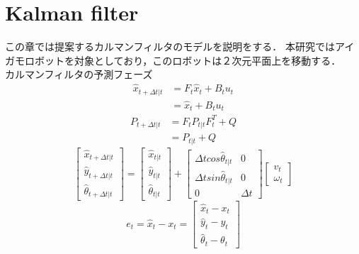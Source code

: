 \documentclass[a4paper]{article}
\begin{document}
\section{Kalman filter}
この章では提案するカルマンフィルタのモデルを説明をする．
本研究ではアイガモロボットを対象としており，このロボットは２次元平面上を移動する． \\
カルマンフィルタの予測フェーズ
\begin{align}
    \hat{x}_{t+ \Delta t|t} &= F_{t} \hat{x}_{t} + B_{t} u_{t} \nonumber \\
                            &= \hat{x}_{t} + B_{t} u_{t}
    \label{eq:1}
\end{align}
%
%
\begin{align}
    P_{t+ \Delta t|t} &= F_{t} P_{t|t} F_{t}^{T} + Q \nonumber \\
                            &= P_{t|t} + Q
    \label{eq:2}
\end{align}
%
%
\begin{equation}
    \begin{bmatrix}
    \hat{x}_{t+ \Delta t|t} \\
    \hat{y}_{t+ \Delta t|t} \\
    \hat{\theta}_{t+ \Delta t|t}
    \end{bmatrix} 
    =
    \begin{bmatrix}
        \hat{x}_{t|t} \\
        \hat{y}_{t|t} \\
        \hat{\theta}_{t|t}
    \end{bmatrix} 
    +
    \begin{bmatrix}
        \Delta t cos\hat{\theta}_{t|t} &0 \\
        \Delta t sin\hat{\theta}_{t|t} &0 \\
        0                              &{\Delta}t
    \end{bmatrix}
    \begin{bmatrix}
        v_{t} \\
        \omega_{t}
    \end{bmatrix}
    \label{eq:3} 
\end{equation}
%
%
\begin{equation}
    e_{t} = \hat{x}_{t} - x_{t} =
    \begin{bmatrix}
        \hat{x}_{t} - x_{t} \\
        \hat{y}_{t} - y_{t} \\
        \hat{\theta}_{t} - \theta_{t}
    \end{bmatrix}
    \label{eq:4}
\end{equation}
%
%
\end{document}
